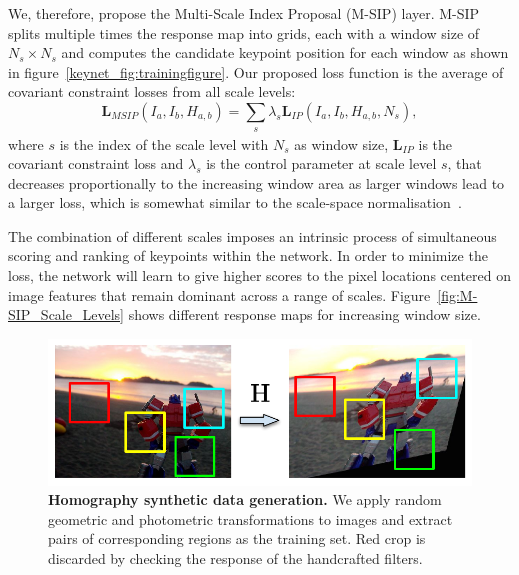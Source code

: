 We, therefore, propose the Multi-Scale Index Proposal (M-SIP) layer. M-SIP splits multiple times the response map into grids, each with a window size of $N_s \times N_s$ and computes the candidate keypoint position for each window as shown in figure~\ref{keynet_fig:trainingfigure}. Our proposed loss function is the average of covariant constraint losses from all scale levels: 
\begin{equation}
\mathbf{L}_{MSIP}(I_{a}, I_{b}, H_{a,b}) =  \sum_{\substack{s}}\lambda_{s} \mathbf{L}_{IP}(I_{a}, I_{b}, H_{a,b},N_s),
  \label{eq:context_losses_m}
\end{equation}
where $s$ is the index of the scale level with $N_s$ as window size, $\mathbf{L}_{IP}$ is the covariant constraint loss and $\lambda_{s}$ is the control parameter at scale level $s$, that decreases proportionally to the increasing window area as larger windows lead to a larger loss, which is somewhat similar to the scale-space normalisation~\cite{mikolajczykIJCV2004}. \par 

The combination of different scales imposes an intrinsic process of simultaneous scoring and ranking of keypoints within the network. In order to minimize the loss, the network will learn to give higher scores to the pixel locations centered on image features that remain dominant across a range of scales. Figure~\ref{fig:M-SIP_Scale_Levels} shows different response maps for increasing window size.

\begin{figure}
 \hspace*{-0.1cm} 
 \vspace{-0.4cm}
    \centering
    \includegraphics[width=\linewidth]{main/chapter02/figures/dataset_v3.pdf}
    \vspace{-0.0cm}
    \caption[Homography synthetic data generation]{\textbf{Homography synthetic data generation.} We apply random geometric and photometric transformations to images and extract pairs of corresponding regions as the training set. Red crop is discarded by checking the response of the handcrafted filters.}
    \label{fig:dataset}
\end{figure}

